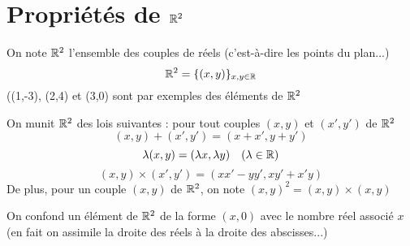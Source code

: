 \section{Propriétés de $\mathbb{R}^2$}
On note $\mathbb{R}^2$ l'ensemble des couples de réels (c'est-à-dire les points du plan...) 
$$\mathbb{R}^2 = \{(x,y)\}_{x,y\in\mathbb{R}}$$
((1,-3), (2,4) et (3,0) sont par exemples des éléments de $\mathbb{R}^2$\newline

On munit $\mathbb{R}^2$ des lois suivantes : pour tout couples $(x,y)$ et $(x',y')$ de $\mathbb{R}^2$
$$(x,y) + (x',y') = (x+x',y+y')$$
$$\lambda (x,y) = (\lambda x, \lambda y) \quad (\lambda \in \mathbb{R})$$
$$(x,y) \times (x',y') = (xx' - yy',xy'+x'y)$$
De plus, pour un couple $(x,y)$ de $\mathbb{R}^2$, on note $(x,y)^2 = (x,y) \times (x,y)$\newline

On confond un élément de $\mathbb{R}^2$ de la forme $(x,0)$ avec le nombre réel associé $x$ (en fait on assimile la droite des réels à la droite des abscisses...)\newline

